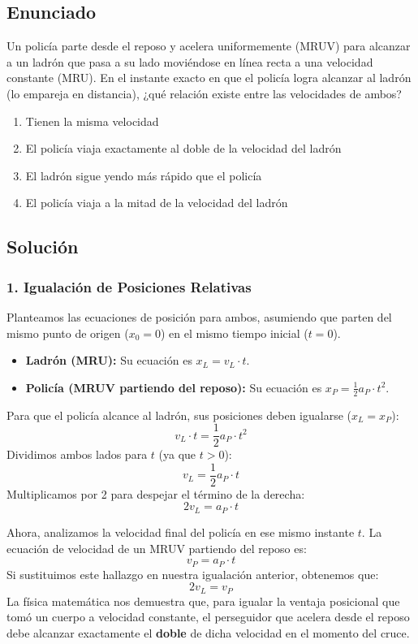 \documentclass[12pt, a4paper]{article}
\begin{document}
\newpage

\subsection*{Enunciado}
Un policía parte desde el reposo y acelera uniformemente (MRUV) para alcanzar a un ladrón que pasa a su lado moviéndose en línea recta a una velocidad constante (MRU). En el instante exacto en que el policía logra alcanzar al ladrón (lo empareja en distancia), ¿qué relación existe entre las velocidades de ambos?
\begin{enumerate}[label=\alph*)]
    \item Tienen la misma velocidad
    \item El policía viaja exactamente al doble de la velocidad del ladrón
    \item El ladrón sigue yendo más rápido que el policía
    \item El policía viaja a la mitad de la velocidad del ladrón
\end{enumerate}

\subsection*{Solución}

\subsubsection*{1. Igualación de Posiciones Relativas}
Planteamos las ecuaciones de posición para ambos, asumiendo que parten del mismo punto de origen ($x_0 = 0$) en el mismo tiempo inicial ($t=0$).
\begin{itemize}
    \item \textbf{Ladrón (MRU):} Su ecuación es $x_L = v_L \cdot t$.
    \item \textbf{Policía (MRUV partiendo del reposo):} Su ecuación es $x_P = \frac{1}{2} a_P \cdot t^2$.
\end{itemize}

Para que el policía alcance al ladrón, sus posiciones deben igualarse ($x_L = x_P$):
$$ v_L \cdot t = \frac{1}{2} a_P \cdot t^2 $$
Dividimos ambos lados para $t$ (ya que $t > 0$):
$$ v_L = \frac{1}{2} a_P \cdot t $$
Multiplicamos por 2 para despejar el término de la derecha:
$$ 2 v_L = a_P \cdot t $$

Ahora, analizamos la velocidad final del policía en ese mismo instante $t$. La ecuación de velocidad de un MRUV partiendo del reposo es:
$$ v_P = a_P \cdot t $$
Si sustituimos este hallazgo en nuestra igualación anterior, obtenemos que:
$$ 2 v_L = v_P $$
La física matemática nos demuestra que, para igualar la ventaja posicional que tomó un cuerpo a velocidad constante, el perseguidor que acelera desde el reposo debe alcanzar exactamente el \textbf{doble} de dicha velocidad en el momento del cruce.
\end{document}
